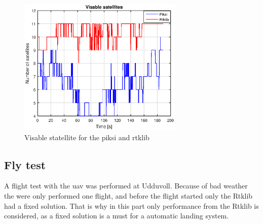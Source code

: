 \begin{figure}[H]
	\centering
		\includegraphics[width=0.7\textwidth]{figs/plots/numSatWalk2.eps}
		\caption{Visable statellite for the piksi and rtklib}
		\label{figure:numSatWalk2}
\end{figure}
\subsection{Fly test}
A flight test with the \gls{uav} was performed at Udduvoll. Because of bad weather the were only performed one flight, and before the flight started only the Rtklib had a fixed solution. That is why in this part only performance from the Rtklib is considered, as a fixed solution is a must for a automatic landing system. 

